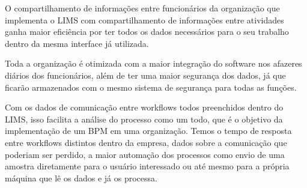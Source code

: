 O compartilhamento de informações entre funcionários da organização que implementa o LIMS com compartilhamento de informações entre atividades ganha maior eficiência por ter todos os dados necessários para o seu trabalho dentro da mesma interface já utilizada.

Toda a organização é otimizada com a maior integração do software nos afazeres diários dos funcionários, além de ter uma maior segurança dos dados, já que ficarão armazenados com o mesmo sistema de segurança para todas as funções.


Com os dados de comunicação entre workflows todos preenchidos dentro do LIMS, isso facilita a análise do processo como um todo, que é o objetivo da implementação de um BPM em uma organização. Temos o tempo de resposta entre workflows distintos dentro da empresa, dados sobre a comunicação que poderiam ser perdido, a maior automação dos processos como envio de uma amostra diretamente para o usuário interessado ou até mesmo para a própria máquina que lê os dados e já os processa.